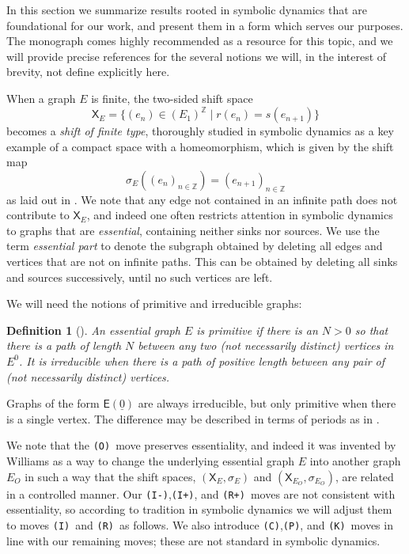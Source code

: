 \documentclass[12pt]{amsbook}%
\newcommand{\XX}[1]{\mathsf X_{#1}}
\theoremstyle{defin}
\newtheorem{defin}[theor]{Definition}
\theoremstyle{remark}
\numberwithin{equation}{chapter}
\numberwithin{theor}{section}
\newcommand{\ZZ}{\mathbb{Z}}
\newcommand{\III}{\mbox{\texttt{\textup{(I)}}}}
\newcommand{\IIIm}{\mbox{\texttt{\textup{(I-)}}}}
\newcommand{\IIIp}{\mbox{\texttt{\textup{(I+)}}}}
\newcommand{\OOO}{\mbox{\texttt{\textup{(O)}}}}
\newcommand{\CCC}{\mbox{\texttt{\textup{(C)}}}}
\newcommand{\RRR}{\mbox{\texttt{\textup{(R)}}}}
\newcommand{\RRRp}{\mbox{\texttt{\textup{(R+)}}}}
\newcommand{\PPP}{\mbox{\texttt{\textup{(P)}}}}
\newcommand{\KKK}{\mbox{\texttt{\textup{(K)}}}}
\newcommand{\GC}{{\mathsf E}}
\begin{document}
 In this section we summarize results rooted in  symbolic dynamics that are foundational for our work, and present them in a form which serves our purposes. The monograph \cite{dlbm:isdc} comes highly recommended as a resource for this topic, and we will provide precise references for the several notions we will, in the interest of brevity, not define explicitly here. %
 
 When a graph $E$ is finite, the two-sided shift space
 \[
 \XX E=\{(e_n)\in(E_1)^\ZZ\mid r(e_n)=s(e_{n+1})\}
 \]
 becomes a \emph{shift of finite type}, thoroughly studied in symbolic dynamics as a key example of a compact space with a homeomorphism, which is given by the shift map
 \[
 \sigma_E((e_n)_{n\in\ZZ})=(e_{n+1})_{n\in\ZZ}
 \]
as laid out in \cite[Definition 2.2.5 and Proposition 2.2.6]{dlbm:isdc}.  We note that any edge not contained in an infinite path does not contribute to $\XX E$, and indeed one often restricts attention in symbolic dynamics to graphs that are \emph{essential}, containing neither sinks nor sources. We use the term \emph{essential part} to denote the subgraph obtained by deleting all edges and vertices that are not on infinite paths. This can be obtained by deleting all sinks and sources successively, until no such vertices are left.
 
 We will need the notions of primitive and irreducible graphs:
 
 \begin{defin}[{\cite[Definitions 2.2.13 and 4.5.7, Theorem 4.5.8]{dlbm:isdc}}]  \label{dfn-irreducible}
 An essential graph $E$ is \emph{primitive} if there is an $N>0$ so that there is a path of length $N$ between any two (not necessarily distinct) vertices in $E^0$. It is  \emph{irreducible} when there is a path of positive length between any pair of (not necessarily distinct) vertices.
 \end{defin}
 
 Graphs of the form $\GC(\underline{0})$ are always irreducible, but only primitive when there is a single vertex. The difference may be described in terms of periods as in \cite[Definition 4.5.2]{dlbm:isdc}.
 
 
 We note that the \OOO\ move preserves essentiality, and indeed it was invented by Williams as a way to change the underlying essential graph $E$ into another graph $E_O$ in such a way that the shift spaces, $(\XX E,\sigma_E)$ and $(\XX {E_O},\sigma_{E_O})$, are related in a controlled manner. Our \IIIm,\IIIp, and \RRRp\ moves are not consistent with essentiality, so according to tradition in symbolic dynamics we will adjust them to moves \III\ and \RRR\ as follows. We also introduce \CCC,\PPP, and \KKK\ moves in line with our remaining moves; these are not standard in symbolic dynamics.
 
\end{document}
